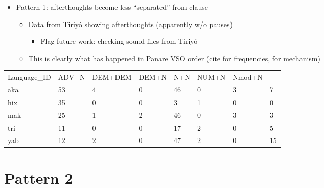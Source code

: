 \documentclass[10pt]{article}
\begin{document}
\begin{itemize}
\tightlist
\item
  Pattern 1: afterthoughts become less ``separated'' from clause

  \begin{itemize}
  \tightlist
  \item
    Data from Tiriyó showing afterthoughts (apparently w/o pauses)

    \begin{itemize}
    \tightlist
    \item
      Flag future work: checking sound files from Tiriyó
    \end{itemize}
  \item
    This is clearly what has happened in Panare VSO order (cite
    \textcites{payne1994ovs} for frequencies,
    \textcites{gildea2000vpgenesis} for mechanism)
  \end{itemize}
\end{itemize}\begin{tabular}[t]{llllllll}

Language\_ID & ADV+N & DEM+DEM & DEM+N & N+N & NUM+N & Nmod+N \\

         aka & 53 &     4 &       0 &    46 &   0 &     3 &      7 \\
         hix & 35 &     0 &       0 &     3 &   1 &     0 &      0 \\
         mak & 25 &     1 &       2 &    46 &   0 &     3 &      3 \\
         tri & 11 &     0 &       0 &    17 &   2 &     0 &      5 \\
         yab & 12 &     2 &       0 &    47 &   2 &     0 &     15 \\

\end{tabular}

\section{Pattern 2}
\end{document}
